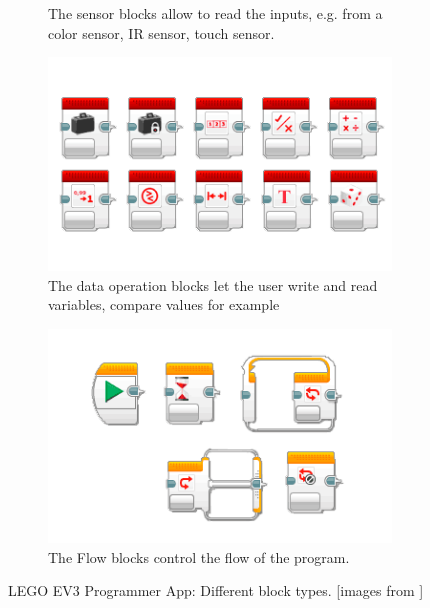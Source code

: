 \documentclass[runningheads,a4paper]{llncs}
\begin{document}
\begin{figure}[H]
\begin{subfigure}[t]{0.45\textwidth}
\caption{The sensor blocks allow to read the inputs, e.g. from a color sensor, IR sensor, touch sensor.} \label{fig:sensorblocks}\end{subfigure}
\begin{subfigure}[t]{0.45\textwidth}\centering\includegraphics[width=.9\columnwidth]{images/LearnToProgram_operations_blocks_landscape.png}
\caption{The data operation blocks let the user write and read variables, compare values for example }\label{fig:operationsblocks}\end{subfigure}\hspace*{\fill}
\begin{subfigure}[t]{0.45\textwidth}\centering\includegraphics[width=.9\columnwidth]{images/LearnToProgram_flow_blocks_landscape.png}
\caption{The Flow blocks control the flow of the program.}\label{fig:flowblocks}\end{subfigure}
\caption{LEGO EV3 Programmer App: Different block types. [images from \cite{legoev3}]}
\end{figure}
  
\end{document}
